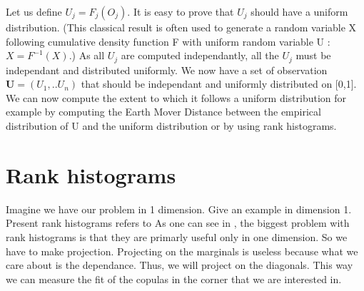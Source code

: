 \documentclass{article}
\begin{document}
   Let us define \begin{math}U_j = F_{j}(O_{j})\end{math}. It is easy to prove that \begin{math} U_j\end{math} should have a uniform distribution. (This classical result is often used to generate a random variable X following cumulative density function F with uniform random variable U : \begin{math}X = F^{-1}(X)\end{math}.)
   As all \begin{math}U_j\end{math} are computed independantly, all the \begin{math}U_j\end{math} must be independant and distributed uniformly.\newline
   \newline
   We now have a set of observation \begin{math} \textbf{U} = (U_1,..U_n)\end{math} that should be independant and uniformly distributed on [0,1]. We can now compute the extent to which it follows a uniform distribution for example by computing the Earth Mover Distance between the empirical distribution of U and the uniform distribution or by using rank histograms.
    
	\section{Rank histograms}   
   
   Imagine we have our problem in 1 dimension.
   Give an example in dimension 1.
   Present rank histograms refers to \cite{hamill2000}
   \newline
   \newline
   As one can see in \cite{hamill2000}, the biggest problem with rank histograms is that they are primarly useful only in one dimension. So we have to make projection. Projecting on the marginals is useless because what we care about is the dependance. Thus, we will project on the diagonals. This way we can measure the fit of the copulas in the corner that we are interested in.
   
   
\end{document}
